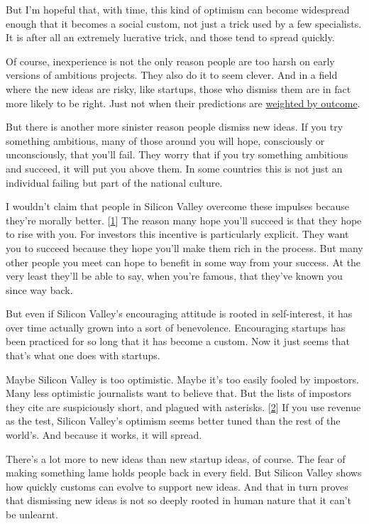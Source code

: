 But I'm hopeful that, with time, this kind of optimism can become
widespread enough that it becomes a social custom, not just a trick used
by a few specialists. It is after all an extremely lucrative trick, and
those tend to spread quickly.

Of course, inexperience is not the only reason people are too harsh on
early versions of ambitious projects. They also do it to seem clever.
And in a field where the new ideas are risky, like startups, those who
dismiss them are in fact more likely to be right. Just not when their
predictions are \href{swan.html}{weighted by outcome}.

But there is another more sinister reason people dismiss new ideas. If
you try something ambitious, many of those around you will hope,
consciously or unconsciously, that you'll fail. They worry that if you
try something ambitious and succeed, it will put you above them. In some
countries this is not just an individual failing but part of the
national culture.

I wouldn't claim that people in Silicon Valley overcome these impulses
because they're morally better. {[}\hyperref[f1n]{1}{]} The reason many
hope you'll succeed is that they hope to rise with you. For investors
this incentive is particularly explicit. They want you to succeed
because they hope you'll make them rich in the process. But many other
people you meet can hope to benefit in some way from your success. At
the very least they'll be able to say, when you're famous, that they've
known you since way back.

But even if Silicon Valley's encouraging attitude is rooted in
self-interest, it has over time actually grown into a sort of
benevolence. Encouraging startups has been practiced for so long that it
has become a custom. Now it just seems that that's what one does with
startups.

Maybe Silicon Valley is too optimistic. Maybe it's too easily fooled by
impostors. Many less optimistic journalists want to believe that. But
the lists of impostors they cite are suspiciously short, and plagued
with asterisks. {[}\hyperref[f2n]{2}{]} If you use revenue as the test,
Silicon Valley's optimism seems better tuned than the rest of the
world's. And because it works, it will spread.

There's a lot more to new ideas than new startup ideas, of course. The
fear of making something lame holds people back in every field. But
Silicon Valley shows how quickly customs can evolve to support new
ideas. And that in turn proves that dismissing new ideas is not so
deeply rooted in human nature that it can't be unlearnt.

